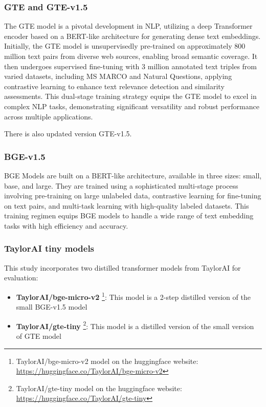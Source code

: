\subsubsection{GTE and GTE-v1.5}
The \ac{GTE} model is a pivotal development in \ac{NLP}, utilizing a deep Transformer encoder based on a \ac{BERT}-like architecture for generating dense text embeddings.
Initially, the \ac{GTE} model is unsupervisedly pre-trained on approximately 800 million text pairs from diverse web sources, enabling broad semantic coverage.
It then undergoes supervised fine-tuning with 3 million annotated text triples from varied datasets, including MS MARCO and Natural Questions, applying contrastive learning to enhance text relevance detection and similarity assessments.
This dual-stage training strategy equips the \ac{GTE} model to excel in complex \ac{NLP} tasks, demonstrating significant versatility and robust performance across multiple applications.

There is also updated version \ac{GTE}-v1.5.

\subsubsection{BGE-v1.5}
\ac{BGE} Models \cite{bge_embedding} are built on a BERT-like architecture, available in three sizes: small, base, and large.
They are trained using a sophisticated multi-stage process involving pre-training on large unlabeled data, contrastive learning for fine-tuning on text pairs, and multi-task learning with high-quality labeled datasets.
This training regimen equips BGE models to handle a wide range of text embedding tasks with high efficiency and accuracy.


\subsubsection{TaylorAI tiny models}
This study incorporates two distilled transformer models from TaylorAI for evaluation:

\begin{itemize}
  \item \textbf{TaylorAI/bge-micro-v2} \footnote{TaylorAI/bge-micro-v2 model on the huggingface website: \url{https://huggingface.co/TaylorAI/bge-micro-v2}}: This model is a 2-step distilled version of the small BGE-v1.5 model
  \item \textbf{TaylorAI/gte-tiny} \footnote{TaylorAI/gte-tiny model on the huggingface website: \url{https://huggingface.co/TaylorAI/gte-tiny}}: This model is a distilled version of the small version of GTE model
\end{itemize}


